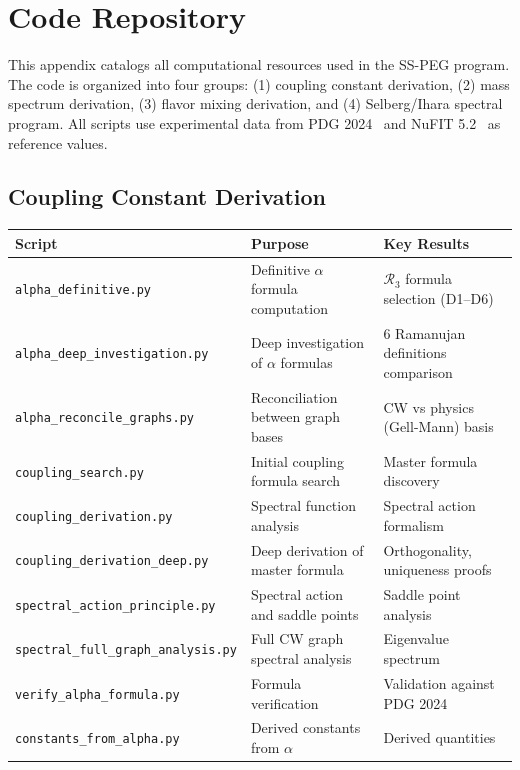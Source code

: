 \appendix

\section{Code Repository}\label{app:code}

This appendix catalogs all computational resources used in the SS-PEG program. The code is organized into four groups: (1) coupling constant derivation, (2) mass spectrum derivation, (3) flavor mixing derivation, and (4) Selberg/Ihara spectral program. All scripts use experimental data from PDG 2024~\cite{pdg2024} and NuFIT 5.2~\cite{nufit52} as reference values.

\subsection{Coupling Constant Derivation}\label{app:coup_code}

\begin{center}
\small
{}
\label{tab:coup_scripts}
\begin{tabular}{lll}
\hline\hline
Script & Purpose & Key Results \\
\hline
\texttt{alpha\_definitive.py} & Definitive $\alpha$ formula computation & $\mathcal{R}_3$ formula selection (D1--D6) \\
\texttt{alpha\_deep\_investigation.py} & Deep investigation of $\alpha$ formulas & 6 Ramanujan definitions comparison \\
\texttt{alpha\_reconcile\_graphs.py} & Reconciliation between graph bases & CW vs physics (Gell-Mann) basis \\
\texttt{coupling\_search.py} & Initial coupling formula search & Master formula discovery \\
\texttt{coupling\_derivation.py} & Spectral function analysis & Spectral action formalism \\
\texttt{coupling\_derivation\_deep.py} & Deep derivation of master formula & Orthogonality, uniqueness proofs \\
\texttt{spectral\_action\_principle.py} & Spectral action and saddle points & Saddle point analysis \\
\texttt{spectral\_full\_graph\_analysis.py} & Full CW graph spectral analysis & Eigenvalue spectrum \\
\texttt{verify\_alpha\_formula.py} & Formula verification & Validation against PDG 2024 \\
\texttt{constants\_from\_alpha.py} & Derived constants from $\alpha$ & Derived quantities \\
\hline\hline
\end{tabular}
\end{center}

